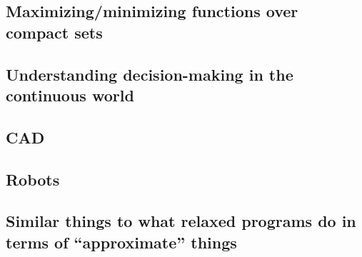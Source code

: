 \documentclass{article}           %
\begin{document}
\subsection{Maximizing/minimizing functions over compact sets}
\subsection{Understanding decision-making in the continuous world}
\subsection{CAD}
\subsection{Robots}
\subsection{Similar things to what relaxed programs do in terms of ``approximate'' things}




\end{document}
